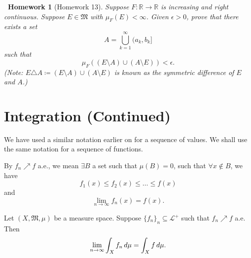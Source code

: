 \documentclass[notoc,notitlepage]{tufte-book}
\newtheorem*{homework}{\faCogs\ Homework}
\begin{document}
\begin{homework}[Homework 13]\label{homework:13}
  Suppose $F : \mathbb{R} \to \mathbb{R}$ is
  increasing and right continuous.
  Suppose $E \in \mathfrak{M}$ with $\mu_F(E) < \infty$.
  Given $\epsilon > 0$, prove that there exists a set
  \begin{equation*}
    A = \bigcup_{k=1}^{\infty} (a_k, b_k]
  \end{equation*}
  such that
  \begin{equation*}
    \mu_F((E \setminus A) \cup (A \setminus E)) < \epsilon.
  \end{equation*}
  (Note: $E \triangle A \coloneqq (E \setminus A) \cup (A \setminus E)$
  is known as the symmetric difference of $E$ and $A$.)
\end{homework}

\section{Integration (Continued)}%
\label{sec:integration_continued}

\begin{notation}
  We have used a similar notation earlier on
  for a sequence of values.
  We shall use the same notation for a sequence of functions.

  By $f_n \nearrow f$ a.e., we mean
  $\exists B$ a set such that $\mu(B) = 0$,
  such that $\forall x \notin B$, we have
  \begin{equation*}
    f_1(x) \leq f_2(x) \leq \hdots \leq f(x)
  \end{equation*}
  and
  \begin{equation*}
    \lim_{n \to \infty} f_n(x) = f(x).
  \end{equation*}
\end{notation}

\begin{crly}\label{crly:monotone_convergence_theorem_a_e_ver_}
  Let $(X, \mathfrak{M}, \mu)$ be a measure space.
  Suppose $\{ f_n \}_n \subseteq \mathcal{L}^+$
  such that $f_n \nearrow f$ a.e.
  Then
  \begin{equation*}
    \lim_{n \to \infty} \int_X f_n \mathop{}\!d{\mu} = \int_{X} f \mathop{}\!d{\mu}.
  \end{equation*}
\end{crly}
\end{document}
